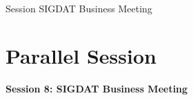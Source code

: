 \clearpage
{}
\begin{ThreeSessionOverview}{Session }{\daydateyear}
  {SIGDAT Business Meeting}
\end{ThreeSessionOverview}

\newpage
\section*{Parallel Session }
{\bfseries\large Session 8: SIGDAT Business Meeting}\\
\TrackALoc\hfill\sessionchair{}{}
\clearpage


